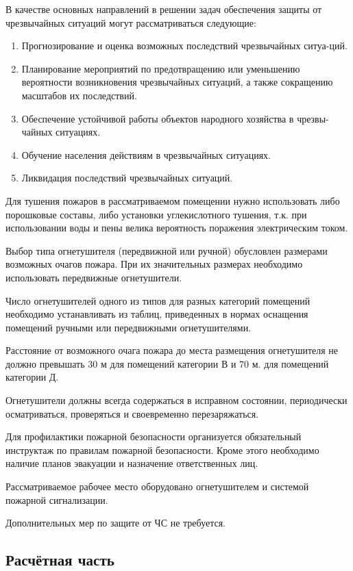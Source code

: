В качестве основных направлений в решении задач обеспечения защиты от чрезвычайных ситуаций могут рассматриваться следующие:

\begin{enumerate}[1.]
	\item Прогнозирование и оценка возможных последствий чрезвычайных ситуа-ций.
	\item Планирование мероприятий по предотвращению или уменьшению вероятности возникновения чрезвычайных ситуаций, а также сокращению масштабов их последствий.
	\item Обеспечение устойчивой работы объектов народного хозяйства в чрезвы-чайных ситуациях.
	\item Обучение населения действиям в чрезвычайных ситуациях.
	\item Ликвидация последствий чрезвычайных ситуаций.
\end{enumerate}

Для тушения пожаров в рассматриваемом помещении нужно использовать либо порошковые составы, либо установки углекислотного тушения, т.к. при использовании воды и пены велика вероятность поражения электрическим током.

Выбор типа огнетушителя (передвижной или ручной) обусловлен размерами возможных очагов пожара. При их значительных размерах необходимо использовать передвижные огнетушители.

Число огнетушителей одного из типов для разных категорий помещений необходимо устанавливать из таблиц, приведенных в нормах оснащения помещений ручными или передвижными огнетушителями.

Расстояние от возможного очага пожара до места размещения огнетушителя не должно превышать 30 м для помещений категории В и 70 м. для помещений категории Д.

Огнетушители должны всегда содержаться в исправном состоянии, периодически осматриваться, проверяться и своевременно перезаряжаться.

Для профилактики пожарной безопасности организуется обязательный инструктаж по правилам пожарной безопасности. Кроме этого необходимо наличие планов эвакуации и назначение ответственных лиц.

Рассматриваемое рабочее место оборудовано огнетушителем и системой пожарной сигнализации.

Дополнительных мер по защите от ЧС не требуется.

\subsection{Расчётная часть}


